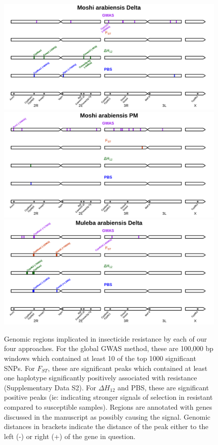 \documentclass[a4paper,12pt]{article}
\begin{document}
\clearpage

\begin{figure}[h]
	\hspace{2cm}\includegraphics*[width = 13cm]{../supplementary_implicated_regions/Moshi_arabiensis_Delta_implicated_regions.png}
	\vskip 0.8cm
	\hspace{2cm}\includegraphics*[width = 13cm]{../supplementary_implicated_regions/Moshi_arabiensis_PM_implicated_regions.png}
	\vskip 0.8cm
	\hspace{2cm}\includegraphics*[width = 13cm]{../supplementary_implicated_regions/Muleba_arabiensis_Delta_implicated_regions.png}
	\caption{\footnotesize Genomic regions implicated in insecticide resistance by each of our four approaches. For the global GWAS method, these are 100,000 bp windows which contained at least 10 of the top 1000 significant SNPs. For $F_{ST}$, these are significant peaks which contained at least one haplotype significantly positively associated with resistance (Supplementary Data S2). For $\Delta H_{12}$ and PBS, these are significant positive peaks (ie: indicating stronger signals of selection in resistant compared to susceptible samples). Regions are annotated with genes discussed in the manuscript as possibly causing the signal. Genomic distances in brackets indicate the distance of the peak either to the left (-) or right (+) of the gene in question.}
	\label{FigS9}
\end{figure}
\end{document}
